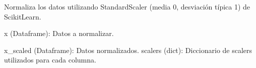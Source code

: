 \documentclass[letterpaper,10pt,spanish]{sphinxmanual}
\begin{document}
\begin{fulllineitems}
\label{\detokenize{Funciones_Generales:normalizar.normalizar_datos}}
\pysigstartsignatures
\pysiglinewithargsret
{}
{}
{}
\pysigstopsignatures
\sphinxAtStartPar
Normaliza los datos utilizando StandardScaler (media 0, desviación típica 1) de Scikit\sphinxhyphen{}Learn.
\begin{description}
\sphinxAtStartPar
x (Dataframe): Datos a normalizar.

\sphinxAtStartPar
x\_scaled (Dataframe): Datos normalizados.
scalers (dict): Diccionario de scalers utilizados para cada columna.

\end{description}

\end{fulllineitems}

\label{\detokenize{Funciones_Generales:module-guardar_metricas}}
\end{document}
